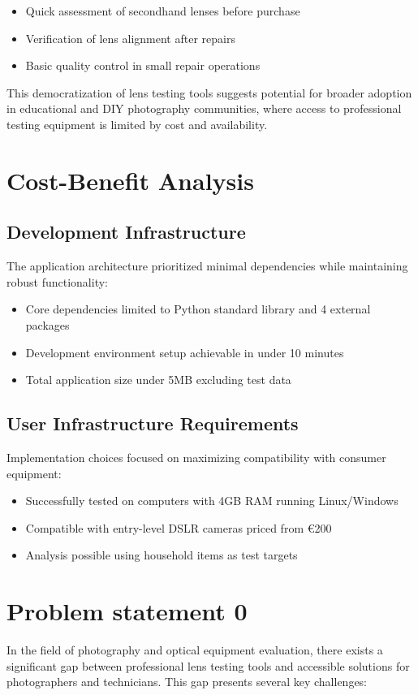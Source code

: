 \begin{itemize}
    \item Quick assessment of secondhand lenses before purchase
    \item Verification of lens alignment after repairs
    \item Basic quality control in small repair operations
\end{itemize}

This democratization of lens testing tools suggests potential for broader adoption in educational and DIY photography communities, where access to professional testing equipment is limited by cost and availability.

\section{Cost-Benefit Analysis}

\subsection{Development Infrastructure}
The application architecture prioritized minimal dependencies while maintaining robust functionality:

\begin{itemize}
    \item Core dependencies limited to Python standard library and 4 external packages
    \item Development environment setup achievable in under 10 minutes
    \item Total application size under 5MB excluding test data
\end{itemize}

\subsection{User Infrastructure Requirements}
Implementation choices focused on maximizing compatibility with consumer equipment:

\begin{itemize}
    \item Successfully tested on computers with 4GB RAM running Linux/Windows
    \item Compatible with entry-level DSLR cameras priced from €200
    \item Analysis possible using household items as test targets
\end{itemize}

\section{Problem statement 0}
In the field of photography and optical equipment evaluation, there exists a significant gap between professional lens testing tools and accessible solutions for photographers and technicians. This gap presents several key challenges:

